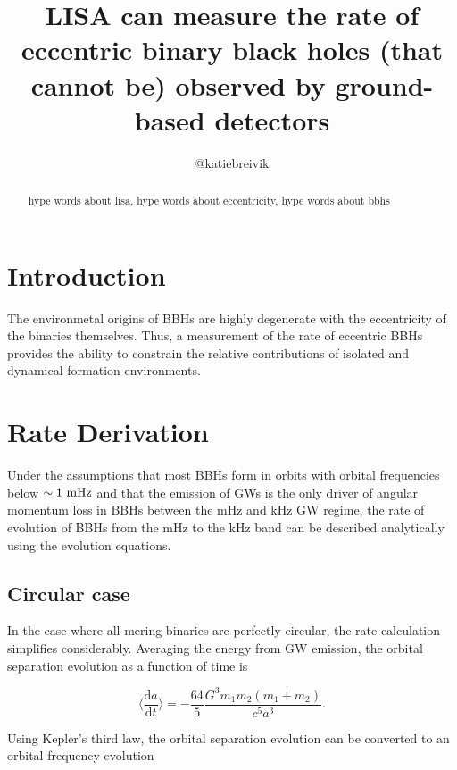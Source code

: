 \documentclass[twocolumn]{aastex631}
\begin{document}
\title{LISA can measure the rate of eccentric binary black holes (that cannot be) observed by ground-based detectors}

\author{@katiebreivik}

\begin{abstract}
    hype words about lisa, hype words about eccentricity, hype words about bbhs
\end{abstract}

\section{Introduction}
\label{sec:intro}

The environmetal origins of BBHs are highly degenerate with the eccentricity of
the binaries themselves. Thus, a measurement of the rate of eccentric BBHs
provides the ability to constrain the relative contributions of isolated and
dynamical formation environments.

\section{Rate Derivation}
\label{sec:rates}

Under the assumptions that most BBHs form in orbits with orbital frequencies below $\sim 1~\rm{mHz}$ and that the emission of GWs is the only driver of angular momentum loss in BBHs between the mHz and kHz GW regime, the rate of evolution of BBHs from the mHz to the kHz band can be described analytically using the \citet{Peters1964} evolution equations.


\subsection{Circular case}
\label{sec:circ}
In the case where all mering binaries are perfectly circular, the rate calculation simplifies considerably. Averaging the energy from GW emission, the orbital separation evolution as a function of time is

\begin{equation}
    \Big\langle \frac{\mathrm{d}a}{\mathrm{d}t} \Big\rangle = - \frac{64}{5} \frac{G^3 m_1 m_2 (m_1 + m_2)}{c^5 a^3}.
    \label{eq:dadt_circ}
\end{equation}

Using Kepler's third law, the orbital separation evolution can be converted to an orbital frequency evolution
\end{document}
